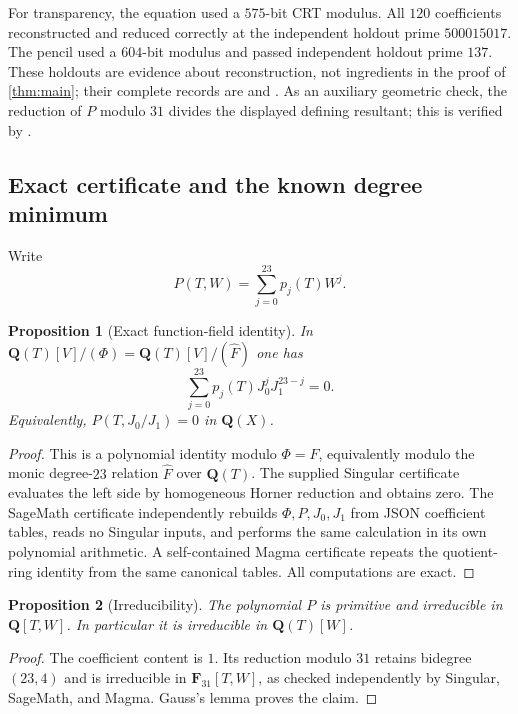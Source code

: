 \documentclass[11pt]{amsart}
\newtheorem{proposition}[proposition]{Proposition}
\theoremstyle{definition}
\theoremstyle{remark}
\newcommand{\QQ}{\mathbf Q}
\newcommand{\FF}{\mathbf F}
\begin{document}
For transparency, the equation used a $575$-bit CRT modulus.  All $120$
coefficients reconstructed and reduced correctly at the independent holdout
prime $500015017$.  The pencil used a $604$-bit modulus and passed independent
holdout prime $137$.  These holdouts are evidence about reconstruction, not
ingredients in the proof of \cref{thm:main}; their complete records are
 and
.  As an auxiliary geometric check,
the reduction of $P$ modulo $31$ divides the displayed defining resultant;
this is verified by .

\subsection{Exact certificate and the known degree minimum}
\label{sec:certificate}

Write
\[
 P(T,W)=\sum_{j=0}^{23}p_j(T)W^j.
\]

\begin{proposition}[Exact function-field identity]\label{prop:identity}
In $\QQ(T)[V]/(\Phi)=\QQ(T)[V]/(\widehat F)$ one has
\[
 \sum_{j=0}^{23}p_j(T)J_0^jJ_1^{23-j}=0.
\]
Equivalently, $P(T,J_0/J_1)=0$ in $\QQ(X)$.
\end{proposition}

\begin{proof}
This is a polynomial identity modulo $\Phi=F$, equivalently modulo the monic
degree-$23$ relation $\widehat F$ over $\QQ(T)$.  The supplied Singular
certificate evaluates the left side by homogeneous Horner reduction and
obtains zero.  The SageMath certificate independently rebuilds
$\Phi,P,J_0,J_1$ from JSON coefficient tables, reads no Singular inputs, and
performs the same calculation in its own polynomial arithmetic.  A
self-contained Magma certificate repeats the quotient-ring identity from the
same canonical tables.  All computations are exact.
\end{proof}

\begin{proposition}[Irreducibility]\label{prop:irreducible}
The polynomial $P$ is primitive and irreducible in $\QQ[T,W]$.  In
particular it is irreducible in $\QQ(T)[W]$.
\end{proposition}

\begin{proof}
The coefficient content is $1$.  Its reduction modulo $31$ retains bidegree
$(23,4)$ and is irreducible in $\FF_{31}[T,W]$, as checked independently by
Singular, SageMath, and Magma.  Gauss's lemma proves the claim.
\end{proof}
\end{document}
